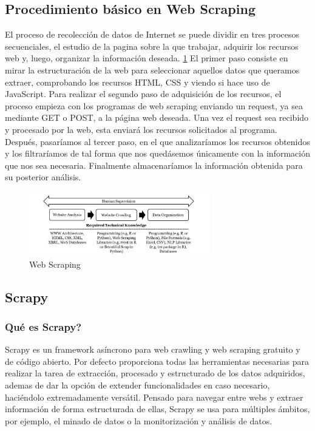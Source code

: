 \subsection{Procedimiento básico en Web Scraping}
El proceso de recolección de datos de Internet se puede dividir en tres procesos secuenciales, el estudio de la pagina sobre la que trabajar, adquirir los recursos web y, luego, organizar la información deseada. \ref{fig:ej2}
\newline
\newline
El primer paso consiste en mirar la estructuración de la web para seleccionar aquellos datos que queramos extraer, comprobando los recursos HTML, CSS y viendo si hace uso de JavaScript. Para realizar el segundo paso de adquisición de los recursos, el proceso empieza con los programas de web scraping enviando un request, ya sea mediante GET o POST, a la página web deseada. Una vez el request sea recibido y procesado por la web, esta enviará los recursos solicitados al programa. Después, pasaríamos al tercer paso, en el que analizaríamos los recursos obtenidos y los filtraríamos de tal forma que nos quedásemos únicamente con la información que nos sea necesaria. Finalmente almacenaríamos la información obtenida para su posterior análisis.
\newline
\begin{figure} [h!]
	\centering
	\includegraphics[width=0.7\textwidth]{fig/Web-Scraping-Adapted-from-Krotov-and-Tennyson-2018.png}
	\caption[Web Scraping (Krotov y Tennyson 2018)]{Web Scraping \footnotemark}
	\label{fig:ej2}
\end{figure}

\subsection{Scrapy}

\subsubsection{Qué es Scrapy?}
Scrapy es un framework asíncrono para web crawling y web scraping gratuito y de código abierto. Por defecto proporciona todas las herramientas necesarias para realizar la tarea de extracción, procesado y estructurado de los datos adquiridos, ademas de dar la opción de extender funcionalidades en caso necesario, haciéndolo extremadamente versátil. \cite{yang2019design}
\newline
\newline
Pensado para navegar entre webs y extraer información de forma estructurada de ellas, Scrapy se usa para múltiples ámbitos, por ejemplo, el minado de datos o la monitorización y análisis de datos.

